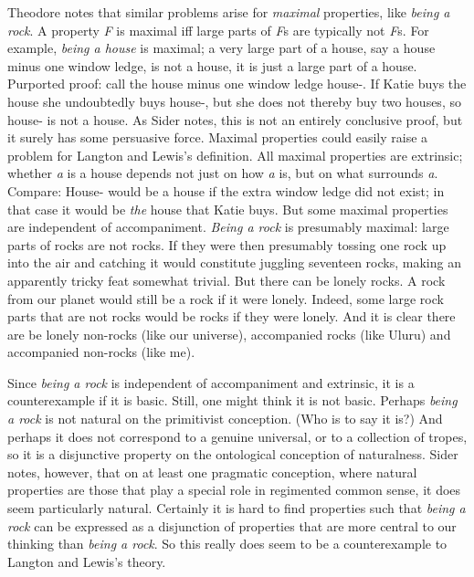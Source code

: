 Theodore \citet{Sider2001} notes that similar problems arise for \textit{maximal} properties, like \textit{being a rock}. A property \textit{F} is maximal iff large parts of \textit{F}s are typically not \textit{F}s. For example, \textit{being a house} is maximal; a very large part of a house, say a house minus one window ledge, is not a house, it is just a large part of a house. Purported proof: call the house minus one window ledge house-. If Katie buys the house she undoubtedly buys house-, but she does not thereby buy two houses, so house- is not a house. As Sider notes, this is not an entirely conclusive proof, but it surely has some persuasive force. Maximal properties could easily raise a problem for Langton and Lewis's definition. All maximal properties are extrinsic; whether \textit{a} is a house depends not just on how \textit{a} is, but on what surrounds \textit{a}. Compare: House- would be a house if the extra window ledge did not exist; in that case it would be \textit{the} house that Katie buys. But some maximal properties are independent of accompaniment. \textit{Being a rock} is presumably maximal: large parts of rocks are not rocks. If they were then presumably tossing one rock up into the air and catching it would constitute juggling seventeen rocks, making an apparently tricky feat somewhat trivial. But there can be lonely rocks. A rock from our planet would still be a rock if it were lonely. Indeed, some large rock parts that are not rocks would be rocks if they were lonely. And it is clear there are be lonely non\nobreakdash-rocks (like our universe), accompanied rocks (like Uluru) and accompanied non\nobreakdash-rocks (like me).

Since \textit{being a rock} is independent of accompaniment and extrinsic, it is a counterexample if it is basic. Still, one might think it is not basic. Perhaps \textit{being a rock} is not natural on the primitivist conception. (Who is to say it is?) And perhaps it does not correspond to a genuine universal, or to a collection of tropes, so it is a disjunctive property on the ontological conception of naturalness. Sider notes, however, that on at least one pragmatic conception, where natural properties are those that play a special role in regimented common sense, it does seem particularly natural. Certainly it is hard to find properties such that \textit{being a rock} can be expressed as a disjunction of properties that are more central to our thinking than \textit{being a rock}. So this really does seem to be a counterexample to Langton and Lewis's theory.



